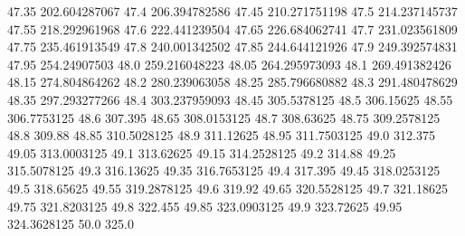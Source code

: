           47.35    202.604287067
           47.4    206.394782586
          47.45    210.271751198
           47.5    214.237145737
          47.55    218.292961968
           47.6    222.441239504
          47.65    226.684062741
           47.7    231.023561809
          47.75    235.461913549
           47.8    240.001342502
          47.85    244.644121926
           47.9    249.392574831
          47.95     254.24907503
           48.0    259.216048223
          48.05    264.295973093
           48.1    269.491382426
          48.15    274.804864262
           48.2    280.239063058
          48.25    285.796680882
           48.3    291.480478629
          48.35    297.293277266
           48.4    303.237959093
          48.45      305.5378125
           48.5        306.15625
          48.55      306.7753125
           48.6          307.395
          48.65      308.0153125
           48.7        308.63625
          48.75      309.2578125
           48.8           309.88
          48.85      310.5028125
           48.9        311.12625
          48.95      311.7503125
           49.0          312.375
          49.05      313.0003125
           49.1        313.62625
          49.15      314.2528125
           49.2           314.88
          49.25      315.5078125
           49.3        316.13625
          49.35      316.7653125
           49.4          317.395
          49.45      318.0253125
           49.5        318.65625
          49.55      319.2878125
           49.6           319.92
          49.65      320.5528125
           49.7        321.18625
          49.75      321.8203125
           49.8          322.455
          49.85      323.0903125
           49.9        323.72625
          49.95      324.3628125
           50.0            325.0
